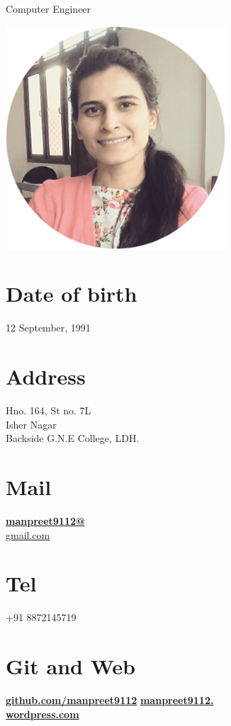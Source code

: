 \documentclass[]{friggeri-cv}
\begin{document}
      {Computer Engineer}
      

\begin{aside}
\includegraphics[scale=0.30]{amar.png}
 \section{Date of birth}
  12 September, 1991
 \section{Address}
  Hno. 164, St no. 7L\\Isher Nagar\\ Backside G.N.E College,
LDH.  
  \section{Mail}
    \href{mailto:manpreet9112@gmail.com}{\textbf{manpreet9112@}\\gmail.com}
  \section{Tel}
    +91 8872145719
  \section{Git and Web}
    \href{http://github.com/manpreet9112}{\textbf{github.com/manpreet9112}}
    \href{http://manpreet9112.wordpress.com}{\textbf{manpreet9112.\\wordpress.com}}

\end{aside}
\end{document}
